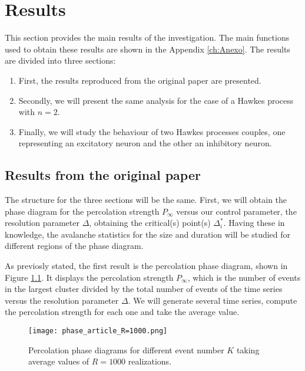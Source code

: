 \chapter{Results} \label{ch:resultados}

This section provides the main results of the investigation. The main functions used to obtain these results are shown in the Appendix \ref{ch:Anexo}. 
The results are divided into three sections:
\begin{enumerate}
    \item First, the results reproduced from the original paper \cite{notarmuzi2021percolation} are presented.
    \item Secondly, we will present the same analysis for the case of a Hawkes process with $n=2$.
    \item Finally, we will study the behaviour of two Hawkes processes couples, one representing an excitatory neuron and the other an inhibitory neuron.
\end{enumerate}

\section{Results from the original paper}

The structure for the three sections will be the same. First, we will obtain the phase diagram for the percolation strength $P_{\infty}$ versus our control parameter, the resolution parameter 
$\Delta$, obtaining the critical(s) point(s) $\Delta^*_{i}$. Having these in knowledge, the avalanche statistics for the size and duration will be studied for different regions 
of the phase diagram.  

As previosly stated, the first result is the percolation phase diagram, shown in Figure \ref{f:phase_diagram_article}. 
It displays the percolation strength $P_{\infty}$, which is the number of events in the largest cluster divided by the total number of events of the time series
versus the resolution parameter $\Delta$. We will generate several time series, compute the percolation strength for each one and take the average value.

\begin{figure}[H]
    \centering
    \texttt{[image: phase\_article\_R=1000.png]}
    \caption{Percolation phase diagrams for different event number $K$ taking average values of $R=1000$ realizations.}
    \label{f:phase_diagram_article}
\end{figure}

